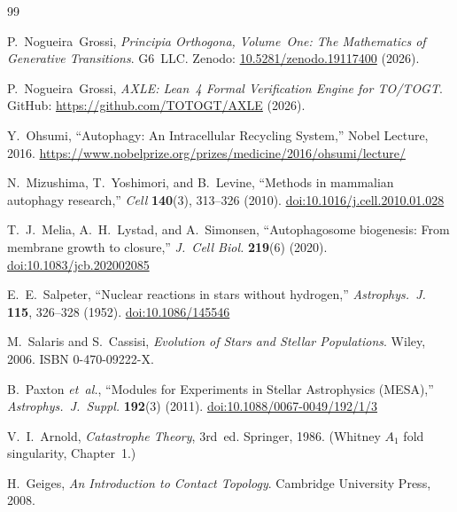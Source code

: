 \documentclass[12pt,a4paper]{article}
\begin{document}
\begin{thebibliography}{99}
\sloppy

P.~Nogueira~Grossi,
\textit{Principia Orthogona, Volume~One: The Mathematics of Generative
Transitions}.
G6~LLC. Zenodo:
\href{https://doi.org/10.5281/zenodo.19117400}{10.5281/zenodo.19117400}
(2026).

P.~Nogueira~Grossi,
\textit{AXLE: Lean~4 Formal Verification Engine for TO/TOGT}.
GitHub: \url{https://github.com/TOTOGT/AXLE} (2026).

Y.~Ohsumi,
``Autophagy: An Intracellular Recycling System,''
Nobel Lecture, 2016.
\url{https://www.nobelprize.org/prizes/medicine/2016/ohsumi/lecture/}

N.~Mizushima, T.~Yoshimori, and B.~Levine,
``Methods in mammalian autophagy research,''
\textit{Cell} \textbf{140}(3), 313--326 (2010).
\href{https://doi.org/10.1016/j.cell.2010.01.028}{doi:10.1016/j.cell.2010.01.028}

T.~J.~Melia, A.~H.~Lystad, and A.~Simonsen,
``Autophagosome biogenesis: From membrane growth to closure,''
\textit{J.~Cell Biol.} \textbf{219}(6) (2020).
\href{https://doi.org/10.1083/jcb.202002085}{doi:10.1083/jcb.202002085}

E.~E.~Salpeter,
``Nuclear reactions in stars without hydrogen,''
\textit{Astrophys.~J.} \textbf{115}, 326--328 (1952).
\href{https://doi.org/10.1086/145546}{doi:10.1086/145546}

M.~Salaris and S.~Cassisi,
\textit{Evolution of Stars and Stellar Populations}.
Wiley, 2006. ISBN 0-470-09222-X.

B.~Paxton \textit{et~al.},
``Modules for Experiments in Stellar Astrophysics (MESA),''
\textit{Astrophys.~J.~Suppl.} \textbf{192}(3) (2011).
\href{https://doi.org/10.1088/0067-0049/192/1/3}{doi:10.1088/0067-0049/192/1/3}

V.~I.~Arnold,
\textit{Catastrophe Theory}, 3rd~ed.
Springer, 1986. (Whitney $A_1$ fold singularity, Chapter~1.)

H.~Geiges,
\textit{An Introduction to Contact Topology}.
Cambridge University Press, 2008.

\end{thebibliography}
\end{document}
